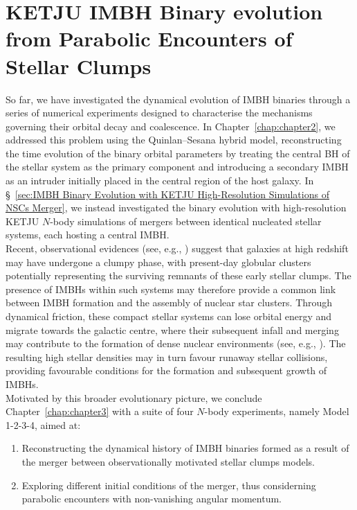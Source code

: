 \documentclass[12pt,twoside,openany]{book}
\begin{document}
\section{KETJU IMBH Binary evolution from Parabolic Encounters of Stellar Clumps}
\label{sec:KETJU IMBH Binary evolution from Parabolic Encounters of Stellar Clumps}

So far, we have investigated the dynamical evolution of IMBH binaries through a series of numerical experiments designed to characterise the mechanisms governing their orbital decay and coalescence. In Chapter~\ref{chap:chapter2}, we addressed this problem using the Quinlan--Sesana hybrid model, reconstructing the time evolution of the binary orbital parameters by treating the central BH of the stellar system as the primary component and introducing a secondary IMBH as an intruder initially placed in the central region of the host galaxy. In \S~\ref{sec:IMBH Binary Evolution with KETJU High-Resolution Simulations of NSCs Merger}, we instead investigated the binary evolution with high-resolution KETJU $N$-body simulations of mergers between identical nucleated stellar systems, each hosting a central IMBH.\\Recent, observational evidences (see, e.g., \parencite{Eros_2026}) suggest that galaxies at high redshift may have undergone a clumpy phase, with present-day globular clusters potentially representing the surviving remnants of these early stellar clumps. The presence of IMBHs within such systems may therefore provide a common link between IMBH formation and the assembly of nuclear star clusters. Through dynamical friction, these compact stellar systems can lose orbital energy and migrate towards the galactic centre, where their subsequent infall and merging may contribute to the formation of dense nuclear environments (see, e.g., \citealt{Khan_2026}). The resulting high stellar densities may in turn favour runaway stellar collisions, providing favourable conditions for the formation and subsequent growth of IMBHs.\\Motivated by this broader evolutionary picture, we conclude Chapter~\ref{chap:chapter3} with a suite of four $N$-body experiments, namely Model 1-2-3-4, aimed at:
\begin{enumerate}
 \item Reconstructing the dynamical history of IMBH binaries formed as a result of the merger between observationally motivated stellar clumps models.
 \item Exploring different initial conditions of the merger, thus considerning parabolic encounters with non-vanishing angular momentum.
\end{enumerate}
\end{document}
